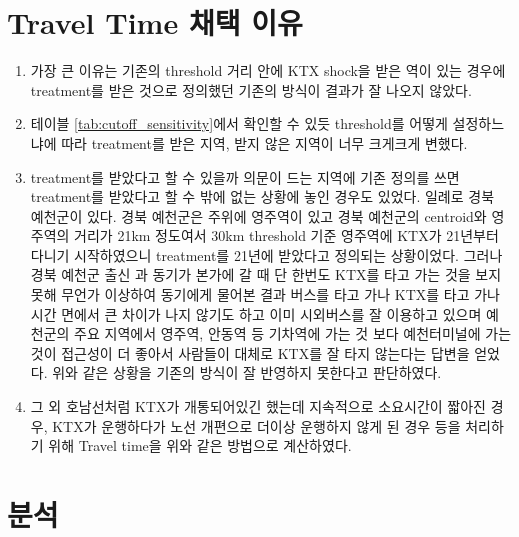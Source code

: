\documentclass[a4paper, 10pt]{article}
\begin{document}
    \section{Travel Time 채택 이유}
        \begin{enumerate}
            \item 가장 큰 이유는
                기존의 threshold 거리 안에 KTX shock을 받은 역이 있는 경우에 treatment를
                받은 것으로 정의했던 기존의 방식이 결과가 잘 나오지 않았다.
            \item 테이블 \ref{tab:cutoff_sensitivity}에서 확인할 수 있듯 threshold를 어떻게 설정하느냐에 따라
                treatment를 받은 지역, 받지 않은 지역이 너무 크게크게 변했다.
            \item treatment를 받았다고 할 수 있을까 의문이 드는 지역에 기존 정의를 쓰면
                treatment를 받았다고 할 수 밖에 없는 상황에 놓인 경우도 있었다.
                일례로 경북 예천군이 있다. 경북 예천군은 주위에 영주역이 있고
                경북 예천군의 centroid와 영주역의 거리가 21km 정도여서 30km threshold 기준
                영주역에 KTX가 21년부터 다니기 시작하였으니
                treatment를 21년에 받았다고 정의되는 상황이었다. 그러나 경북 예천군 출신 과 동기가
                본가에 갈 때 단 한번도 KTX를 타고 가는 것을 보지 못해 무언가 이상하여 동기에게 물어본 결과
                버스를 타고 가나 KTX를 타고 가나 시간 면에서 큰 차이가 나지 않기도 하고 이미 시외버스를 잘 이용하고
                있으며 예천군의 주요 지역에서 영주역, 안동역 등 기차역에 가는 것 보다 예천터미널에 가는 것이
                접근성이 더 좋아서 사람들이 대체로 KTX를 잘 타지 않는다는 답변을 얻었다.
                위와 같은 상황을 기존의 방식이 잘 반영하지 못한다고 판단하였다.
            \item 그 외 호남선처럼 KTX가
                개통되어있긴 했는데 지속적으로 소요시간이 짧아진 경우,
                KTX가 운행하다가 노선 개편으로
                더이상 운행하지 않게 된 경우 등을 처리하기 위해 Travel time을 위와 같은
                방법으로 계산하였다.
        \end{enumerate}
        \begin{table}[H]
            \centering
            \caption{Treatment status by distance cutoff}
            \label{tab:cutoff_sensitivity}
            
        \end{table}

    \section{분석}
\end{document}
